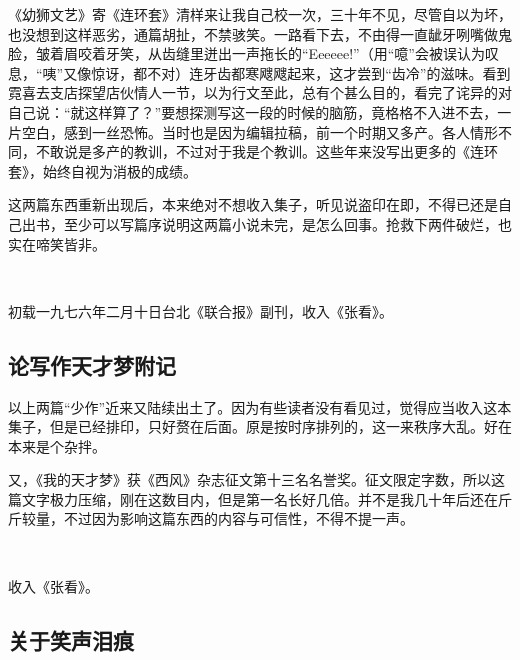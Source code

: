 \par 《幼狮文艺》寄《连环套》清样来让我自己校一次，三十年不见，尽管自以为坏，也没想到这样恶劣，通篇胡扯，不禁骇笑。一路看下去，不由得一直龇牙咧嘴做鬼脸，皱着眉咬着牙笑，从齿缝里迸出一声拖长的“Eeeeee!”（用“噫”会被误认为叹息，“咦”又像惊讶，都不对）连牙齿都寒飕飕起来，这才尝到“齿冷”的滋味。看到霓喜去支店探望店伙情人一节，以为行文至此，总有个甚么目的，看完了诧异的对自己说：“就这样算了？”要想探测写这一段的时候的脑筋，竟格格不入进不去，一片空白，感到一丝恐怖。当时也是因为编辑拉稿，前一个时期又多产。各人情形不同，不敢说是多产的教训，不过对于我是个教训。这些年来没写出更多的《连环套》，始终自视为消极的成绩。
\par 这两篇东西重新出现后，本来绝对不想收入集子，听见说盗印在即，不得已还是自己出书，至少可以写篇序说明这两篇小说未完，是怎么回事。抢救下两件破烂，也实在啼笑皆非。
\par  
\par *初载一九七六年二月十日台北《联合报》副刊，收入《张看》。



\subsection{论写作天才梦附记}


\par 以上两篇“少作”近来又陆续出土了。因为有些读者没有看见过，觉得应当收入这本集子，但是已经排印，只好赘在后面。原是按时序排列的，这一来秩序大乱。好在本来是个杂拌。
\par 又，《我的天才梦》获《西风》杂志征文第十三名名誉奖。征文限定字数，所以这篇文字极力压缩，刚在这数目内，但是第一名长好几倍。并不是我几十年后还在斤斤较量，不过因为影响这篇东西的内容与可信性，不得不提一声。
\par  
\par *收入《张看》。



\subsection{关于笑声泪痕}



